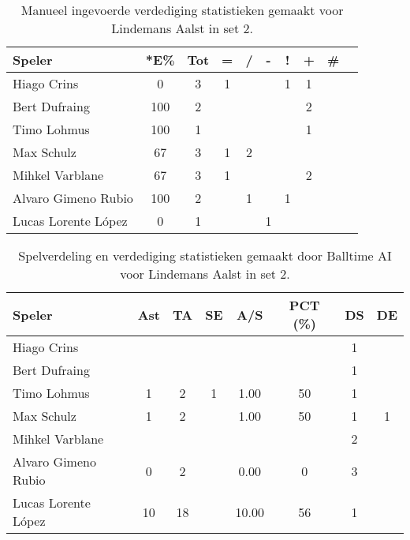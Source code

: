\begin{table}[ht!]
  \centering
  \scriptsize
    \begin{tabular}{|l|c|c|c|c|c|c|c|c|c|}
      \hline
      \textbf{Speler} & *E\% & Tot & = & / & - & ! & + & \# \\ \hline
      Hiago Crins & 0 & 3 & 1 &  &  & 1 & 1 &  \\ 
      Bert Dufraing & 100 & 2 &  &  &  &  & 2 &  \\
      Timo Lohmus & 100 & 1 &  &  &  &  & 1 &  \\
      Max Schulz & 67 & 3 & 1 & 2 &  &  &  &  \\
      Mihkel Varblane & 67 & 3 & 1 &  &  &  & 2 &  \\
      Alvaro Gimeno Rubio & 100 & 2 &  & 1 &  & 1 &  &  \\
      Lucas Lorente López & 0 & 1 &  &  & 1 &  &  &  \\ \hline
  \end{tabular}
  \caption[Manueel ingevoerde verdediging statistieken gemaakt voor Lindemans Aalst in set 2]{\label{tab:PL1DigAalstMan2}Manueel ingevoerde verdediging statistieken gemaakt voor Lindemans Aalst in set 2.}
\end{table}

\begin{table}[ht!]
  \centering
  \scriptsize
  \begin{tabular}{|l|c|c|c|c|c|c|c|} \hline
    \textbf{Speler} & Ast & TA & SE & A/S & PCT (\%) & DS & DE \\ \hline
    Hiago Crins &  &  &  &  &  & 1 &  \\
    Bert Dufraing &  &  &  &  &  & 1 &  \\ 
    Timo Lohmus & 1 & 2 & 1 & 1.00 & 50 & 1 &  \\
    Max Schulz & 1 & 2 &  & 1.00 & 50 & 1 & 1 \\
    Mihkel Varblane &  &  &  &  &  & 2 &  \\
    Alvaro Gimeno Rubio & 0 & 2 &  & 0.00 & 0 & 3 &  \\
    Lucas Lorente López & 10 & 18 &  & 10.00 & 56 & 1 &  \\ \hline
  \end{tabular}
  \caption[Spelverdeling en verdediging statistieken gemaakt door Balltime AI voor Lindemans Aalst in set 2]{\label{tab:PL1SetDigAalstAI2}Spelverdeling en verdediging statistieken gemaakt door Balltime AI voor Lindemans Aalst in set 2.}
\end{table}

